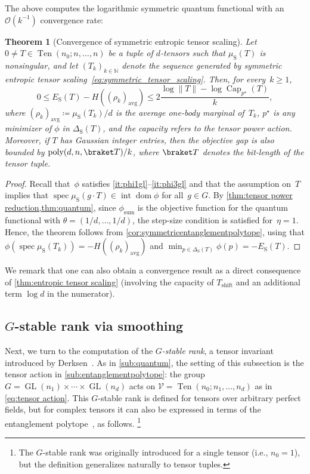 \documentclass[11pt,letterpaper]{article}
\newtheorem{theorem}{Theorem}[section]
\numberwithin{equation}{section}
\newcommand{\NN}{\mathbb{N}}
\newcommand{\VV}{\mathcal{V}}
\newcommand{\logqfunc}{E}
\DeclareMathOperator{\poly}{poly}
\DeclareMathOperator{\intr}{int}
\DeclareMathOperator{\dom}{dom}
\DeclareMathOperator{\spec}{spec}
\DeclareMathOperator{\Capacity}{Cap}
\DeclareMathOperator{\GL}{GL}
\DeclareMathOperator{\Sym}{S}
\DeclareMathOperator{\Ten}{Ten}
\DeclareMathOperator{\Shf}{shift}
\DeclareMathOperator{\Sum}{sum}
\begin{document}
The above computes the logarithmic symmetric quantum functional with an $\mathcal{O}(k^{-1})$ convergence rate:

\begin{theorem}[Convergence of symmetric entropic tensor scaling]\label{thm:symmetric-quantum}
    Let $0 \neq T \in \Ten(n_0; n, \ldots, n)$ be a tuple of $d$-tensors such that $\mu_{\Sym}(T)$ is nonsingular, and let $(T_k)_{k\in\NN}$ denote the sequence generated by symmetric entropic tensor scaling~\eqref{eq:symmetric_tensor_scaling}.
    Then, for every~$k\geq1$,
    \[
        0 \leq \logqfunc_{\Sym}(T) - H((\rho_k)_\text{avg}) \leq 2 \frac{\log\|T\| - \log\Capacity_{p^\star}(T)}{k},
    \]
    where $(\rho_k)_\text{avg} \coloneqq \mu_{\Sym}(T_k)/d$ is the average one-body marginal of~$T_k$, $p^\star$ is any minimizer of $\phi$ in $\Delta_{\Sym}(T)$, and the capacity refers to the tensor power action.
    Moreover, if $T$ has Gaussian integer entries, then the objective gap is also bounded by $\poly(d, n, \braket T)/k$, where $\braket T$ denotes the bit-length of the tensor tuple.
\end{theorem}
\begin{proof}
    Recall that~$\phi$ satisfies \ref{it:phi1gl}--\ref{it:phi3gl} and that the assumption on~$T$ implies that $\spec\mu_{\Sym}(g\cdot T) \in \intr\dom\phi$ for all~$g \in G$.
    By \cref{thm:tensor power reduction,thm:quantum}, since $\phi_{\Sum}$ is the objective function for the quantum functional with $\theta=(1/d,\dots,1/d)$, the step-size condition is satisfied for~$\eta=1$.
    Hence, the theorem follows from \cref{cor:symmetricentanglementpolytope}, using that $\phi(\spec\mu_{\Sym}(T_k)) = -H((\rho_k)_\text{avg})$ and $\min_{p \in \Delta_{\Sym}(T)}\phi(p) = -\logqfunc_{\Sym}(T)$.
\end{proof}

We remark that one can also obtain a convergence result as a direct consequence of \cref{thm:entropic tensor scaling} (involving the capacity of $T_{\Shf}$ and an additional term $\log d$ in the numerator).


\subsection{\texorpdfstring{$G$}{G}-stable rank via smoothing}\label{sub:G-stable-rk}
Next, we turn to the computation of the \emph{$G$-stable rank}, a tensor invariant introduced by Derksen~\cite{Derksen-22}.
As in \cref{sub:quantum}, the setting of this subsection is the tensor action in \cref{sub:entanglementpolytope}: the group $G = \GL(n_1)\times\cdots\times\GL(n_d)$ acts on $\VV = \Ten(n_0; n_1, \ldots, n_d)$ as in \cref{eq:tensor action}.
This $G$-stable rank is defined for tensors over arbitrary perfect fields, but for complex tensors it can also be expressed in terms of the entanglement polytope~\cite[Thm~5.2]{Derksen-22}, as follows.%
\footnote{The $G$-stable rank was originally introduced for a single tensor (i.e., $n_0 = 1$), but the definition generalizes naturally to tensor tuples.}
\end{document}
